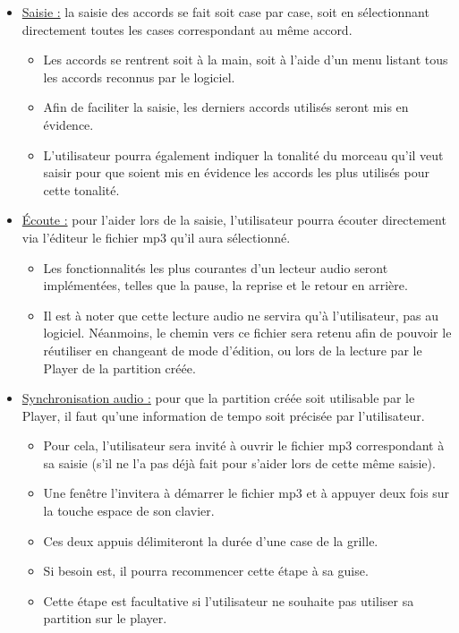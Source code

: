 \begin{itemize}
 \item \underline{Saisie :} la saisie des accords se fait soit case par case, soit en sélectionnant directement toutes les cases correspondant au même accord.
 \begin{itemize}
  \item Les accords se rentrent soit à la main, soit à l'aide d'un menu listant tous les accords reconnus par le logiciel.
  \item Afin de faciliter la saisie, les derniers accords utilisés seront mis en évidence.
  \item L'utilisateur pourra également indiquer la tonalité du morceau qu'il veut saisir pour que soient mis en évidence les accords les plus utilisés pour cette tonalité.
 \end{itemize}
 \item \underline{Écoute :} pour l'aider lors de la saisie, l'utilisateur pourra écouter directement via l'éditeur le fichier mp3 qu'il aura sélectionné.
 \begin{itemize}
  \item Les fonctionnalités les plus courantes d'un lecteur audio seront implémentées, telles que la pause, la reprise et le retour en arrière.
  \item Il est à noter que cette lecture audio ne servira qu'à l'utilisateur, pas au logiciel. Néanmoins, le chemin vers ce fichier sera retenu afin de pouvoir le réutiliser en changeant de mode d'édition, ou lors de la lecture par le Player de la partition créée.
 \end{itemize}
 \item \underline{Synchronisation audio :} pour que la partition créée soit utilisable par le Player, il faut qu'une information de tempo soit précisée par l'utilisateur.
 \begin{itemize}
  \item Pour cela, l'utilisateur sera invité à ouvrir le fichier mp3 correspondant à sa saisie (s'il ne l'a pas déjà fait pour s'aider lors de cette même saisie).
  \item Une fenêtre l'invitera à démarrer le fichier mp3 et à appuyer deux fois sur la touche espace de son clavier.
  \item Ces deux appuis délimiteront la durée d'une case de la grille.
  \item Si besoin est, il pourra recommencer cette étape à sa guise.
  \item Cette étape est facultative si l'utilisateur ne souhaite pas utiliser sa partition sur le player.
 \end{itemize}
\end{itemize}

